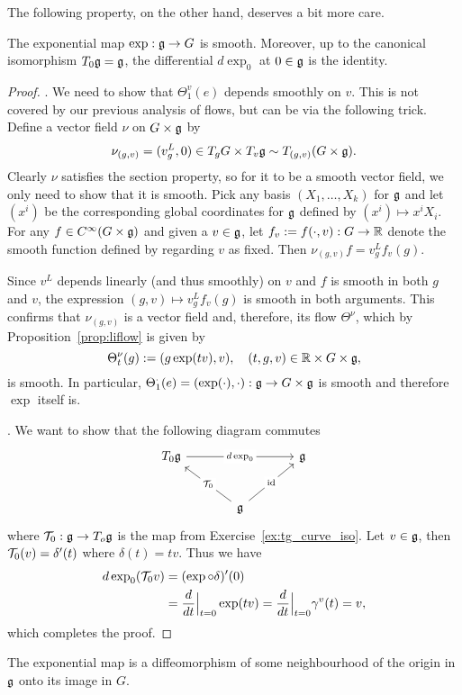 The following property, on the other hand, deserves a bit more care.
\begin{theorem}
  The exponential map $\exp:\mathfrak{g}\to G$ is smooth.
  Moreover, up to the canonical isomorphism $T_0\mathfrak{g} = \mathfrak{g}$, the differential $d\exp_0$ at $0\in\mathfrak{g}$ is the identity.
\end{theorem}
\begin{proof}
  . We need to show that $\Theta_1^v(e)$ depends smoothly on $v$.
  This is not covered by our previous analysis of flows, but can be via the following trick.
  Define a vector field $\nu$ on $G\times\mathfrak{g}$ by
  \begin{equation}
    \nu_{(g,v)} = (v^L_g, 0)\in T_gG\times T_v\mathfrak{g} \sim T_{(g,v)}(G\times \mathfrak{g}).
  \end{equation}
  Clearly $\nu$ satisfies the section property, so for it to be a smooth vector field, we only need to show that it is smooth.
  Pick any basis $(X_1,\ldots,X_k)$ for $\mathfrak{g}$ and let $(x^i)$ be the corresponding global coordinates for $\mathfrak{g}$ defined by $(x^i)\mapsto x^i X_i$. 
  For any $f\in C^\infty(G\times\mathfrak{g})$ and given a $v\in\mathfrak{g}$, let $f_v:= f(\cdot, v):G\to\mathbb{R}$ denote the smooth function defined by regarding $v$ as fixed.
  Then $\nu_{(g,v)}f = v^L_g f_v(g)$.

  Since $v^L$ depends linearly (and thus smoothly) on $v$ and $f$ is smooth in both $g$ and $v$, the expression $(g,v)\mapsto  v^L_g f_v(g)$ is smooth in both arguments. This confirms that $\nu_{(g,v)}$ is a vector field and, therefore, its flow $\Theta^\nu$, which by Proposition~\ref{prop:liflow} is given by
  \begin{equation}
    \Theta^\nu_t(g) := (g \exp(tv), v), \quad (t,g,v)\in\mathbb{R}\times G\times\mathfrak{g},
  \end{equation}
  is smooth. In particular, $\Theta^\cdot_1(e)= (\exp(\cdot), \cdot): \mathfrak{g}\to G\times\mathfrak{g}$ is smooth and therefore $\exp$ itself is.

  . We want to show that the following diagram commutes
  \begin{equation}\nonumber
    \begin{tikzcd}[row sep=large, column sep=large]
      T_0\fg \arrow[rr, "d\exp_0" description] & & \fg \\
      & \fg \arrow[ul, "\cT_0" description] \arrow[ur, "\id" description] &
    \end{tikzcd}
  \end{equation}
  where $\mathcal{T}_0:\mathfrak{g}\to T_o\mathfrak{g}$ is the map from Exercise~\ref{ex:tg_curve_iso}.
  Let $v\in\mathfrak{g}$, then $\mathcal{T}_0(v) = \delta'(t)$ where $\delta(t) = tv$.
  Thus we have
  \begin{align}
    d\exp_0 (\mathcal{T}_0 v) &= (\exp \circ \delta)'(0) \\
    &= \frac{d}{dt}\Big|_{t=0} \exp(tv) 
    = \frac{d}{dt}\Big|_{t=0} \gamma^v(t) 
    = v,
  \end{align}
  which completes the proof.
\end{proof}
\begin{corollary}
  The exponential map is a diffeomorphism of some neighbourhood of the origin in $\mathfrak{g}$ onto its image in $G$.
\end{corollary}

